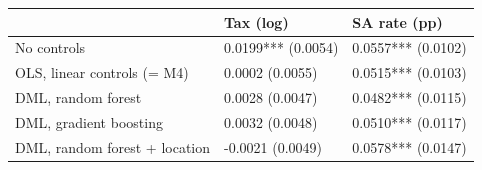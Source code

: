 \begin{tabular}{lll}
\toprule
 & Tax (log) & SA rate (pp) \\
\midrule
No controls & 0.0199*** (0.0054) & 0.0557*** (0.0102) \\
OLS, linear controls (= M4) & 0.0002 (0.0055) & 0.0515*** (0.0103) \\
DML, random forest & 0.0028 (0.0047) & 0.0482*** (0.0115) \\
DML, gradient boosting & 0.0032 (0.0048) & 0.0510*** (0.0117) \\
DML, random forest + location & -0.0021 (0.0049) & 0.0578*** (0.0147) \\
\bottomrule
\end{tabular}
